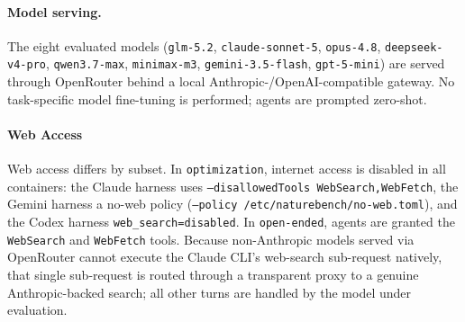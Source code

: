   \paragraph{Model serving.}
  The eight evaluated models (\texttt{glm-5.2}, \texttt{claude-sonnet-5},
  \texttt{opus-4.8}, \texttt{deepseek-v4-pro}, \texttt{qwen3.7-max},
  \texttt{minimax-m3}, \texttt{gemini-3.5-flash}, \texttt{gpt-5-mini}) are served
  through OpenRouter behind a local Anthropic-/OpenAI-compatible gateway. No task-specific model fine-tuning is
  performed; agents are prompted zero-shot.

  \paragraph{Web Access}

    Web access differs by subset. In \texttt{optimization}, internet access is
    disabled in all containers: the Claude harness uses
    \texttt{--disallowedTools WebSearch,WebFetch}, the Gemini harness a no-web
    policy (\texttt{--policy /etc/naturebench/no-web.toml}), and the Codex harness
    \texttt{web\_search=disabled}. In \texttt{open-ended}, agents are granted the
    \texttt{WebSearch} and \texttt{WebFetch} tools. Because non-Anthropic models
    served via OpenRouter cannot execute the Claude CLI's web-search sub-request
    natively, that
    single sub-request is routed through a transparent proxy to a genuine
    Anthropic-backed search; all other turns are handled by the model under
    evaluation. %

